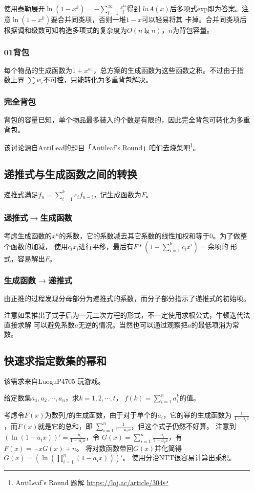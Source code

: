 使用泰勒展开$\displaystyle \ln(1-x^k)=-\sum_{i=1}^\infty{\frac{x^{ki}}{i}}$得到
$ln A(x)$后多项式exp即为答案。注意$\ln (1-x^k)$要合并同类项，否则一堆$1-x$可以轻易将其
卡掉。合并同类项后根据调和级数可知构造多项式的复杂度为$O(n\lg n)$，$n$为背包容量。
\subsubsection{01背包}
每个物品的生成函数为$1+x^{w_i}$，总方案的生成函数为这些函数之积。不过由于指数上界
$\sum{w_i}$不可控，只能转化为多重背包解决。
\subsubsection{完全背包}
背包的容量已知，单个物品最多装入的个数是有限的，因此完全背包可转化为多重背包。

该讨论源自AntiLeaf的题目「Antileaf's Round」咱们去烧菜吧\footnote{
	AntiLeaf's Round 题解
	\url{https://loj.ac/article/304}
}。
\subsection{递推式与生成函数之间的转换}
递推式满足$\displaystyle f_n=\sum_{i=1}^k{c_if_{n-i}}$，记生成函数为$F$。
\subsubsection{递推式$\rightarrow$生成函数}
考虑生成函数的$x^n$的系数，它的系数减去其它系数的线性加权和等于0。为了做整个函数的加减，
使用$c_ix_i$进行平移，最后有$F*(1-\displaystyle \sum_{i=1}^k{c_ix^i})=$余项的
形式，容易解出$F$。
\subsubsection{生成函数$\rightarrow$递推式}
由正推的过程发现分母部分为递推式的系数，而分子部分指示了递推式的初始项。

注意如果推出了式子后为一元二次方程的形式，不一定使用求根公式，牛顿迭代法直接求解
可以避免系数$a$无逆的情况。当然也可以通过观察把$a$的最低项消为常数。
\subsection{快速求指定数集的幂和}
该需求来自LuoguP4705 玩游戏。

给定数集$a_1,a_2,\cdots,a_n$，求$k=1,2,\cdots,t$，
$f(k)=\displaystyle \sum_{i=1}^n{a_i^k}$的值。

考虑令$F(x)$为数列$f$的生成函数，由于对于单个的$a_i$，它的幂的生成函数为
$\frac{1}{1-a_ix}$，而$F(x)$就是它的总和，即
$\displaystyle \sum_{i=1}^n{\frac{1}{1-a_ix}}$，但这个式子仍然不好算。
注意到$(\ln (1-a_ix))'=\frac{-a_i}{1-a_ix}$，令
$G(x)=\displaystyle \sum_{i=1}^n{\frac{-a_i}{1-a_ix}}$，有$F(x)=-xG(x)+n$。
将对数函数带回$G(x)$并化简得
$\displaystyle G(x)=\left(\ln\left(\prod_{i=1}^n{(1-a_ix)}\right)\right)'$。
使用分治NTT很容易计算出乘积。
